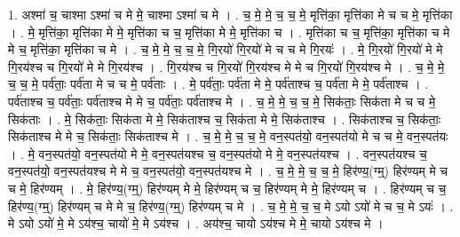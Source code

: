 \documentclass[17pt]{extarticle}
\begin{document}
1. अश्मा॑ च॒ चाश्मा ऽश्मा॑ च मे मे॒ चाश्मा ऽश्मा॑ च मे । . च॒ मे॒ मे॒ च॒ च॒ मे॒ मृत्ति॑का॒ मृत्ति॑का मे च च मे॒ मृत्ति॑का । . मे॒ मृत्ति॑का॒ मृत्ति॑का मे मे॒ मृत्ति॑का च च॒ मृत्ति॑का मे मे॒ मृत्ति॑का च । . मृत्ति॑का च च॒ मृत्ति॑का॒ मृत्ति॑का च मे मे च॒ मृत्ति॑का॒ मृत्ति॑का च मे । . च॒ मे॒ मे॒ च॒ च॒ मे॒ गि॒रयो॑ गि॒रयो॑ मे च च मे गि॒रयः॑ । . मे॒ गि॒रयो॑ गि॒रयो॑ मे मे गि॒रय॑श्च च गि॒रयो॑ मे मे गि॒रय॑श्च । . गि॒रय॑श्च च गि॒रयो॑ गि॒रय॑श्च मे मे च गि॒रयो॑ गि॒रय॑श्च मे । . च॒ मे॒ मे॒ च॒ च॒ मे॒ पर्व॑ताः॒ पर्व॑ता मे च च मे॒ पर्व॑ताः । . मे॒ पर्व॑ताः॒ पर्व॑ता मे मे॒ पर्व॑ताश्च च॒ पर्व॑ता मे मे॒ पर्व॑ताश्च । . पर्व॑ताश्च च॒ पर्व॑ताः॒ पर्व॑ताश्च मे मे च॒ पर्व॑ताः॒ पर्व॑ताश्च मे । . च॒ मे॒ मे॒ च॒ च॒ मे॒ सिक॑ताः॒ सिक॑ता मे च च मे॒ सिक॑ताः । . मे॒ सिक॑ताः॒ सिक॑ता मे मे॒ सिक॑ताश्च च॒ सिक॑ता मे मे॒ सिक॑ताश्च । . सिक॑ताश्च च॒ सिक॑ताः॒ सिक॑ताश्च मे मे च॒ सिक॑ताः॒ सिक॑ताश्च मे । . च॒ मे॒ मे॒ च॒ च॒ मे॒ वन॒स्पत॑यो॒ वन॒स्पत॑यो मे च च मे॒ वन॒स्पत॑यः । . मे॒ वन॒स्पत॑यो॒ वन॒स्पत॑यो मे मे॒ वन॒स्पत॑यश्च च॒ वन॒स्पत॑यो मे मे॒ वन॒स्पत॑यश्च । . वन॒स्पत॑यश्च च॒ वन॒स्पत॑यो॒ वन॒स्पत॑यश्च मे मे च॒ वन॒स्पत॑यो॒ वन॒स्पत॑यश्च मे । . च॒ मे॒ मे॒ च॒ च॒ मे॒ हिर॑ण्य॒(ग्म्॒) हिर॑ण्यम् मे च च मे॒ हिर॑ण्यम् । . मे॒ हिर॑ण्य॒(ग्म्॒) हिर॑ण्यम् मे मे॒ हिर॑ण्यम् च च॒ हिर॑ण्यम् मे मे॒ हिर॑ण्यम् च । . हिर॑ण्यम् च च॒ हिर॑ण्य॒(ग्म्॒) हिर॑ण्यम् च मे मे च॒ हिर॑ण्य॒(ग्म्॒) हिर॑ण्यम् च मे । . च॒ मे॒ मे॒ च॒ च॒ मे ऽयो ऽयो॑ मे च च॒ मे ऽयः॑ । . मे ऽयो ऽयो॑ मे॒ मे ऽय॑श्च॒ चायो॑ मे॒ मे ऽय॑श्च । . अय॑श्च॒ चायो ऽय॑श्च मे मे॒ चायो ऽय॑श्च मे । \newline
\end{document}
